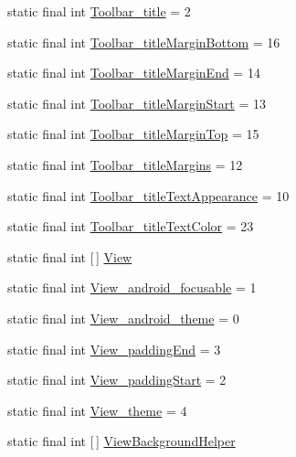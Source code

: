 \begin{DoxyCompactItemize}
static final int \hyperlink{classproject4_1_1xaria_1_1R_1_1styleable_abef8adccf5d6ad9f215787dab4631fcd}{Toolbar\+\_\+title} = 2
\item 
static final int \hyperlink{classproject4_1_1xaria_1_1R_1_1styleable_a246fa138dbd3b691aa3595a8fb636a01}{Toolbar\+\_\+title\+Margin\+Bottom} = 16
\item 
static final int \hyperlink{classproject4_1_1xaria_1_1R_1_1styleable_a5d2d546ae88e0aa378d02d8602e73b8a}{Toolbar\+\_\+title\+Margin\+End} = 14
\item 
static final int \hyperlink{classproject4_1_1xaria_1_1R_1_1styleable_a96bcd70f7086d38b52652bee6e3f119a}{Toolbar\+\_\+title\+Margin\+Start} = 13
\item 
static final int \hyperlink{classproject4_1_1xaria_1_1R_1_1styleable_aae9e96acb00fe36e1bac77812532a605}{Toolbar\+\_\+title\+Margin\+Top} = 15
\item 
static final int \hyperlink{classproject4_1_1xaria_1_1R_1_1styleable_aad3d076117cb0923a57bf3c96cc0a6d5}{Toolbar\+\_\+title\+Margins} = 12
\item 
static final int \hyperlink{classproject4_1_1xaria_1_1R_1_1styleable_ab0deb931fcb51a59a9c57d317339ad4d}{Toolbar\+\_\+title\+Text\+Appearance} = 10
\item 
static final int \hyperlink{classproject4_1_1xaria_1_1R_1_1styleable_ae59bec88cab4e203af7c4a6242b338ed}{Toolbar\+\_\+title\+Text\+Color} = 23
\item 
static final int \mbox{[}$\,$\mbox{]} \hyperlink{classproject4_1_1xaria_1_1R_1_1styleable_a26a934fb1a597b7811923bdd4d3d8ecf}{View}
\item 
static final int \hyperlink{classproject4_1_1xaria_1_1R_1_1styleable_a8789b40250f5591b39eb29d5049ef3a4}{View\+\_\+android\+\_\+focusable} = 1
\item 
static final int \hyperlink{classproject4_1_1xaria_1_1R_1_1styleable_af98caf79414987ddefaf5c9675bb0e64}{View\+\_\+android\+\_\+theme} = 0
\item 
static final int \hyperlink{classproject4_1_1xaria_1_1R_1_1styleable_a5fcfb70d1e2f153ceb31eb7dfb763f57}{View\+\_\+padding\+End} = 3
\item 
static final int \hyperlink{classproject4_1_1xaria_1_1R_1_1styleable_a82fdb93ccc6551d224d5777d9f449770}{View\+\_\+padding\+Start} = 2
\item 
static final int \hyperlink{classproject4_1_1xaria_1_1R_1_1styleable_a1d278e0c69dd3ae9a0e88dac09d952c1}{View\+\_\+theme} = 4
\item 
static final int \mbox{[}$\,$\mbox{]} \hyperlink{classproject4_1_1xaria_1_1R_1_1styleable_aba3e0fe0ba2d99dd8aaedee442947fbe}{View\+Background\+Helper}

\end{DoxyCompactItemize}
